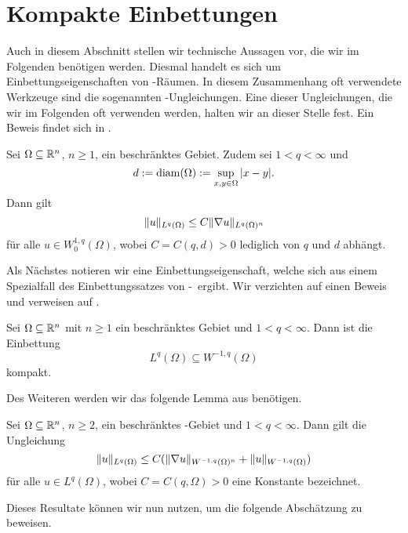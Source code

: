 \section{Kompakte Einbettungen}

Auch in diesem Abschnitt stellen wir technische Aussagen vor, die wir im Folgenden benötigen werden.
Diesmal handelt es sich um Einbettungseigenschaften von \sobolev\hyp{}Räumen.
In diesem Zusammenhang oft verwendete Werkzeuge sind die sogenannten \poincare\hyp{}Ungleichungen.
Eine dieser Ungleichungen, die wir im Folgenden oft verwenden werden, halten wir an dieser Stelle fest. Ein Beweis findet sich in \cite[S.183, Theorem 6.30]{adams2003sobolev}.

\begin{lem}
  \label{lem:poincare}
  Sei $\Omega \subseteq \mathbb{R}^n$, $n \geq 1$, ein beschränktes Gebiet.
  Zudem sei $1 < q < \infty$ und 
  $$
  d := \operatorname{diam}(\Omega) := \sup_{x, y \in \Omega} | x - y |.
  $$
  Dann gilt
  $$
  \lVert u \rVert_{L^q(\Omega)} \leq C \lVert \nabla u \rVert_{L^q(\Omega)^n}
  $$
  für alle $u \in W_0^{1,q}(\Omega)$, wobei $C = C(q,d) > 0$ lediglich von $q$ und $d$ abhängt. 
\end{lem}

Als Nächstes notieren wir eine Einbettungseigenschaft, welche sich aus einem Spezialfall des Einbettungssatzes von \rellich\hyp{}\kondrachov\ ergibt. 
Wir verzichten auf einen Beweis und verweisen auf \cite[S.168, Theorem 6.3]{adams2003sobolev}.

\begin{lem}
  \label{lem:compactEmbedding0}
  Sei $\Omega \subseteq \mathbb{R}^n$ mit $n \geq 1$ ein beschränktes Gebiet und $1 < q < \infty$.
  Dann ist die Einbettung
  $$
  L^q(\Omega) \subseteq W^{-1,q}(\Omega)
  $$
  kompakt.
\end{lem}

Des Weiteren werden wir das folgende Lemma aus \cite[S.186, Lemma 7.1]{necas2012direct} benötigen.
\begin{lem}
  \label{lem:necas}
  Sei $\Omega \subseteq \mathbb{R}^n$, $n \geq 2$, ein beschränktes \lipschitz\hyp{}Gebiet und $1 < q < \infty$.
  Dann gilt die Ungleichung
  $$
  \lVert u \rVert_{L^q(\Omega)} \leq C(\lVert \nabla u \rVert_{W^{-1,q}(\Omega)^n} + \lVert u \rVert_{W^{-1,q}(\Omega)})
  $$
  für alle $u \in L^q(\Omega)$, wobei $C = C(q, \Omega) > 0$ eine Konstante bezeichnet.
\end{lem}

Dieses Resultate können wir nun nutzen, um die folgende Abschätzung zu beweisen.

